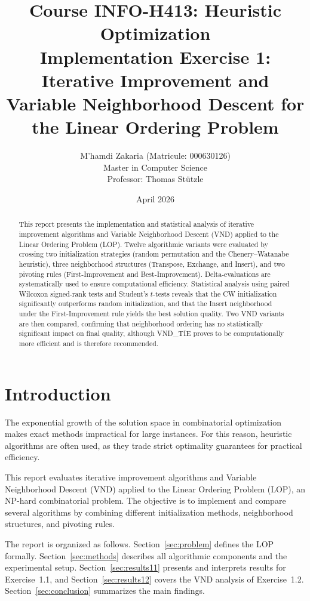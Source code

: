 \documentclass[11pt, a4paper]{article}
\title{\textbf{Course INFO-H413: Heuristic Optimization}\\[0.4em]
\large Implementation Exercise 1: Iterative Improvement and\\
Variable Neighborhood Descent for the Linear Ordering Problem}
\author{M'hamdi Zakaria (Matricule: 000630126)\\
Master in Computer Science\\[0.3em]
\small Professor: Thomas St\"{u}tzle}
\date{April 2026}
\begin{document}
\maketitle

\begin{abstract}
This report presents the implementation and statistical analysis of iterative improvement algorithms and Variable Neighborhood Descent (VND) applied to the Linear Ordering Problem (LOP). Twelve algorithmic variants were evaluated by crossing two initialization strategies (random permutation and the Chenery--Watanabe heuristic), three neighborhood structures (Transpose, Exchange, and Insert), and two pivoting rules (First-Improvement and Best-Improvement). Delta-evaluations are systematically used to ensure computational efficiency. Statistical analysis using paired Wilcoxon signed-rank tests and Student's $t$-tests reveals that the CW initialization significantly outperforms random initialization, and that the Insert neighborhood under the First-Improvement rule yields the best solution quality. Two VND variants are then compared, confirming that neighborhood ordering has no statistically significant impact on final quality, although VND\_TIE proves to be computationally more efficient and is therefore recommended.
\end{abstract}

\tableofcontents
\newpage

\section{Introduction}

The exponential growth of the solution space in combinatorial optimization makes exact methods impractical for large instances. For this reason, heuristic algorithms are often used, as they trade strict optimality guarantees for practical efficiency.

This report evaluates iterative improvement algorithms and Variable Neighborhood Descent (VND) applied to the Linear Ordering Problem (LOP), an NP-hard combinatorial problem. The objective is to implement and compare several algorithms by combining different initialization methods, neighborhood structures, and pivoting rules.

The report is organized as follows. Section~\ref{sec:problem} defines the LOP formally. Section~\ref{sec:methods} describes all algorithmic components and the experimental setup. Section~\ref{sec:results11} presents and interprets results for Exercise~1.1, and Section~\ref{sec:results12} covers the VND analysis of Exercise~1.2. Section~\ref{sec:conclusion} summarizes the main findings.
\end{document}
